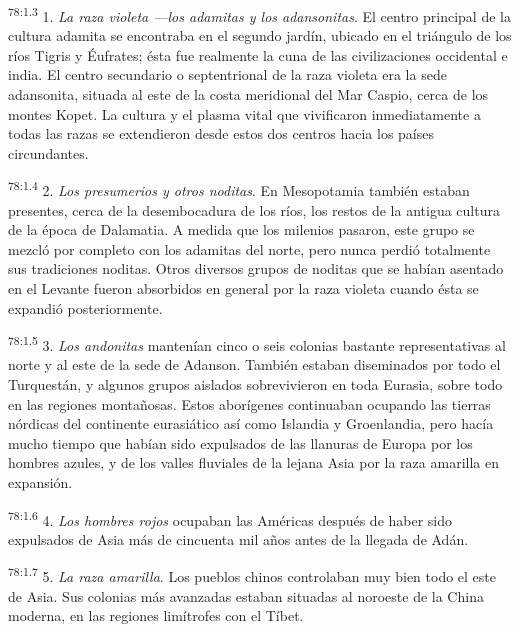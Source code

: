 \par
\textsuperscript{78:1.3} 1. \textit{La raza violeta ---los adamitas y los adansonitas}. El centro principal de la cultura adamita se encontraba en el segundo jardín, ubicado en el triángulo de los ríos Tigris y Éufrates; ésta fue realmente la cuna de las civilizaciones occidental e india. El centro secundario o septentrional de la raza violeta era la sede adansonita, situada al este de la costa meridional del Mar Caspio, cerca de los montes Kopet. La cultura y el plasma vital que vivificaron inmediatamente a todas las razas se extendieron desde estos dos centros hacia los países circundantes.

\par
\textsuperscript{78:1.4} 2. \textit{Los presumerios y otros noditas}. En Mesopotamia también estaban presentes, cerca de la desembocadura de los ríos, los restos de la antigua cultura de la época de Dalamatia. A medida que los milenios pasaron, este grupo se mezcló por completo con los adamitas del norte, pero nunca perdió totalmente sus tradiciones noditas. Otros diversos grupos de noditas que se habían asentado en el Levante fueron absorbidos en general por la raza violeta cuando ésta se expandió posteriormente.

\par
\textsuperscript{78:1.5} 3. \textit{Los andonitas} mantenían cinco o seis colonias bastante representativas al norte y al este de la sede de Adanson. También estaban diseminados por todo el Turquestán, y algunos grupos aislados sobrevivieron en toda Eurasia, sobre todo en las regiones montañosas. Estos aborígenes continuaban ocupando las tierras nórdicas del continente eurasiático así como Islandia y Groenlandia, pero hacía mucho tiempo que habían sido expulsados de las llanuras de Europa por los hombres azules, y de los valles fluviales de la lejana Asia por la raza amarilla en expansión.

\par
\textsuperscript{78:1.6} 4. \textit{Los hombres rojos} ocupaban las Américas después de haber sido expulsados de Asia más de cincuenta mil años antes de la llegada de Adán.

\par
\textsuperscript{78:1.7} 5. \textit{La raza amarilla}. Los pueblos chinos controlaban muy bien todo el este de Asia. Sus colonias más avanzadas estaban situadas al noroeste de la China moderna, en las regiones limítrofes con el Tíbet.

